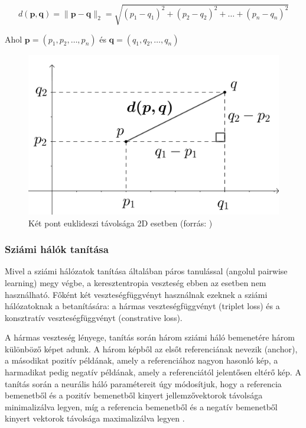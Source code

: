
\[ d(\mathbf{p},\mathbf{q}) = \lVert \mathbf{p} - \mathbf{q} \rVert_2 = \sqrt{(p_1 - q_1)^2 + (p_2 - q_2)^2 + \dots + (p_n - q_n)^2}\]

Ahol $\mathbf{p} = (p_1, p_2, \dots, p_n)$ és $\mathbf{q} = (q_1, q_2, \dots, q_n)$ 

\begin{figure}[ht]
	\centering
	\includegraphics[width=0.65\columnwidth]{figures/euclidean_distance_2d.png}
	\caption{Két pont euklideszi távolsága 2D esetben (forrás: \cite{euclidean})}
	\label{fig:eukl}
\end{figure}

\subsubsection{Sziámi hálók tanítása}

Mivel a sziámi hálózatok tanítása általában páros tanulással (angolul pairwise learning) megy végbe, a keresztentropia veszteség ebben az esetben nem használható. Főként két veszteségfüggvényt használnak ezeknek a sziámi hálózatoknak a betanítására: a hármas veszteségfüggvényt (triplet loss) és a konsztratív veszteségfüggvényt (constrative loss).

A hármas veszteség lényege, tanítás során három sziámi háló bemenetére három különböző képet adunk. A három képből az elsőt referenciának nevezik (anchor), a másodikat pozitív példának, amely a referenciához nagyon hasonló kép, a harmadikat pedig negatív példának, amely a referenciától jelentősen eltérő kép. A tanítás során a neurális háló paramétereit úgy módosítjuk, hogy a referencia bemenetből és a pozitív bemenetből kinyert jellemzővektorok távolsága minimalizálva legyen, míg a referencia bemenetből és a negatív bemenetből kinyert vektorok távolsága maximalizálva legyen \cite{hoffer2015triplet}.

